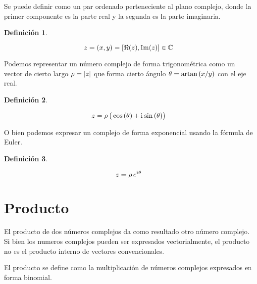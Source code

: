 \documentclass[a5paper,12pt,twoside]{book}
\newtheorem{defn}{{Definición}}[chapter]
\begin{document}
Se puede definir como un par ordenado perteneciente al plano complejo, donde la primer componente es la parte real y la segunda es la parte imaginaria.

\begin{mdframed}[style=MyFrame1]
    \begin{defn}
        \label{defn:VectorForm}
    \end{defn}
    \begin{equation*}
        z = (x,y) = \left[\Re(z),\operatorname{Im}(z)\right] \in \mathbb{C}
    \end{equation*}
\end{mdframed}

Podemos representar un número complejo de forma trigonométrica como un vector de cierto largo $\rho={\left| {z} \right|}$ que forma cierto ángulo $\theta = \operatorname{artan}{(x/y)}$ con el eje real.

\begin{mdframed}[style=MyFrame1]
    \begin{defn}
        \label{defn:TrigForm}
    \end{defn}
    \begin{equation*}
        z = \rho \, \big( \cos{(\theta)} + \mathrm{i}\mkern1mu \sin{(\theta)} \big)
    \end{equation*}
\end{mdframed}

O bien podemos expresar un complejo de forma exponencial usando la fórmula de Euler.

\begin{mdframed}[style=MyFrame1]
    \begin{defn}
        \label{defn:ExpForm}
    \end{defn}
    \begin{equation*}
        z = \rho \, e^{\mathrm{i}\mkern1mu \theta}
    \end{equation*}
\end{mdframed}


\section{Producto}

El producto de dos números complejos da como resultado otro número complejo. Si bien los numeros complejos pueden ser expresados vectorialmente, el producto no es el producto interno de vectores convencionales.

El producto se define como la multiplicación de números complejos expresados en forma binomial.
\end{document}
